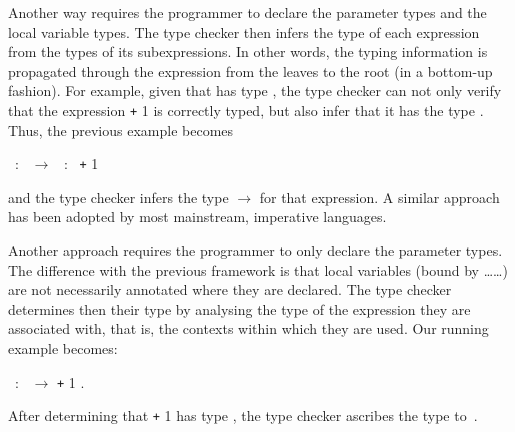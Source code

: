 Another way requires the programmer to declare the parameter types and
the local variable types. The type checker then infers the type of
each expression from the types of its subexpressions. In other words,
the typing information is propagated through the expression from the
leaves to the root (in a bottom\hyp{}up fashion). For example, given
that  has type , the type checker can not only
verify that the expression  \texttt{+} \num{1} is correctly
typed, but also infer that it has the type . Thus, the
previous example becomes
\begin{center}
\Xfun \lpar{}~:~\rpar{} $\rightarrow$ \Xlet
{}~:~ \equal {} \texttt{+} \num{1} \Xin
{}
\end{center}
and the type checker infers the type  $\rightarrow$
 for that expression. A similar approach has been adopted by
most mainstream, imperative languages.

Another approach requires the programmer to only declare the parameter
types. The difference with the previous framework is that local
variables (bound by \Xlet \dots \Xin \dots) are not necessarily
annotated where they are declared. The type checker determines then
their type by analysing the type of the expression they are associated
with, that is, the contexts within which they are used. Our running
example becomes:
\begin{center}
\Xfun \lpar{}~:~\rpar{} $\rightarrow$ \Xlet {}
\equal {} \texttt{+} \num{1} \Xin {}.
\end{center}
After determining that  \texttt{+} \num{1} has type
, the type checker ascribes the type 
to~.

